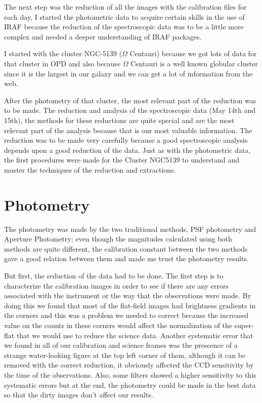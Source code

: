 The next step was the reduction of all the images with the calibration files for each day, I started the photometric data to acquire certain skills in the use of IRAF because the reduction of the spectroscopic data was to be a little more complex and needed a deeper understanding of IRAF packages. 

I started with the cluster NGC-5139 ($ \Omega $ Centauri) because we got lots of data for that cluster in OPD and also because $ \Omega $ Centauri is a well known globular cluster since it is the largest in our galaxy and we can get a lot of information from the web. 

After the photometry of that cluster, the most relevant part of the reduction was to be made. The reduction and analysis of the spectroscopic data (May 14th and 15th), the methods for these reductions are quite special and are the most relevant part of the analysis because that is our most valuable information. The reduction was to be made very carefully because a good spectroscopic analysis depends upon a good reduction of the data. Just as with the photometric data, the first procedures were made for the Cluster NGC5139 to understand and master the techniques of the reduction and extractions.

\section{Photometry}

The photometry was made by the two traditional methods, PSF photometry and Aperture Photometry; even though the magnitudes calculated using both methods are quite different, the calibration constant between the two methods gave a good relation between them and made me trust the photometry results.

But first, the reduction of the data had to be done. The first step is to characterize the calibration images in order to see if there are any errors associated with the instrument or the way that the observations were made. By doing this we found that most of the flat-field images had brightness gradients in the corners and this was a problem we needed to correct because the increased value on the counts in these corners would affect the normalization of the super-flat that we would use to reduce the science data. Another systematic error that we found in all of our calibration and science frames was the prescence of a strange water-looking figure at the top left corner of them, although it can be removed with the correct reduction, it obviously affected the CCD sensitivity by the time of the observations. Also, some filters showed a higher sensitivity to this systematic errors but at the end, the photometry could be made in the best data so that the dirty images don't affect our results.

